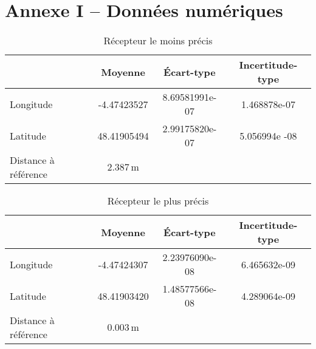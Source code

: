 \section*{Annexe I -- Données numériques}

   \begin{table}[h]
       \centering
       \begin{tabular}{l|ccc}
           \toprule
           \textbf{} & \textbf{Moyenne} & \textbf{Écart-type} & \textbf{Incertitude-type} \\
           \midrule
           Longitude & -4.47423527 & 8.69581991e-07 & 1.468878e-07 \\
           Latitude & 48.41905494 & 2.99175820e-07 & 5.056994e -08 \\
           \midrule
           Distance à référence & $2.387\, \mathrm{m}$ & & \\
           \bottomrule
       \end{tabular}
       \caption{Récepteur le moins précis}
       \label{tab:recept-pas-precis}
   \end{table}

    \begin{table}[h]
        \centering
        \begin{tabular}{l|ccc}
            \toprule
            \textbf{} & \textbf{Moyenne} & \textbf{Écart-type} & \textbf{Incertitude-type} \\
            \midrule
            Longitude & -4.47424307 & 2.23976090e-08 & 6.465632e-09 \\
            Latitude & 48.41903420 & 1.48577566e-08 & 4.289064e-09 \\
           \midrule
           Distance à référence & $0.003\, \mathrm{m}$ & & \\
            \bottomrule
        \end{tabular}
        \caption{Récepteur le plus précis}
        \label{tab:recept-precis}
    \end{table}

